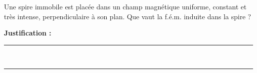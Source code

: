Une spire immobile est placée dans un champ magnétique uniforme, constant et très intense, perpendiculaire à son plan. Que vaut la f.é.m. induite dans la spire ?

\choices

\noindent\textbf{Justification :} \hrulefill \\[2.5ex]
\rule{\linewidth}{0.4pt} \\[2.5ex]
\rule{\linewidth}{0.4pt}
\vfill
